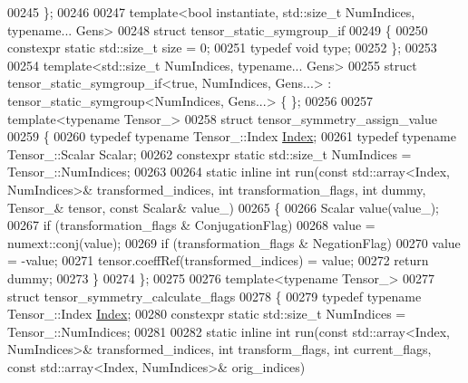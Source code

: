 \begin{DoxyCode}
00245 \};
00246 
00247 \textcolor{keyword}{template}<\textcolor{keywordtype}{bool} instantiate, std::size\_t NumIndices, \textcolor{keyword}{typename}... Gens>
00248 \textcolor{keyword}{struct }tensor\_static\_symgroup\_if
00249 \{
00250   constexpr \textcolor{keyword}{static} std::size\_t size = 0;
00251   \textcolor{keyword}{typedef} \textcolor{keywordtype}{void} type;
00252 \};
00253 
00254 \textcolor{keyword}{template}<std::size\_t NumIndices, \textcolor{keyword}{typename}... Gens>
00255 \textcolor{keyword}{struct }tensor\_static\_symgroup\_if<true, NumIndices, Gens...> : tensor\_static\_symgroup<NumIndices, Gens...> \{
      \};
00256 
00257 \textcolor{keyword}{template}<\textcolor{keyword}{typename} Tensor\_>
00258 \textcolor{keyword}{struct }tensor\_symmetry\_assign\_value
00259 \{
00260   \textcolor{keyword}{typedef} \textcolor{keyword}{typename} Tensor\_::Index \hyperlink{namespace_eigen_a62e77e0933482dafde8fe197d9a2cfde}{Index};
00261   \textcolor{keyword}{typedef} \textcolor{keyword}{typename} Tensor\_::Scalar Scalar;
00262   constexpr \textcolor{keyword}{static} std::size\_t NumIndices = Tensor\_::NumIndices;
00263 
00264   \textcolor{keyword}{static} \textcolor{keyword}{inline} \textcolor{keywordtype}{int} run(\textcolor{keyword}{const} std::array<Index, NumIndices>& transformed\_indices, \textcolor{keywordtype}{int} transformation\_flags,
       \textcolor{keywordtype}{int} dummy, Tensor\_& tensor, \textcolor{keyword}{const} Scalar& value\_)
00265   \{
00266     Scalar value(value\_);
00267     \textcolor{keywordflow}{if} (transformation\_flags & ConjugationFlag)
00268       value = numext::conj(value);
00269     \textcolor{keywordflow}{if} (transformation\_flags & NegationFlag)
00270       value = -value;
00271     tensor.coeffRef(transformed\_indices) = value;
00272     \textcolor{keywordflow}{return} dummy;
00273   \}
00274 \};
00275 
00276 \textcolor{keyword}{template}<\textcolor{keyword}{typename} Tensor\_>
00277 \textcolor{keyword}{struct }tensor\_symmetry\_calculate\_flags
00278 \{
00279   \textcolor{keyword}{typedef} \textcolor{keyword}{typename} Tensor\_::Index \hyperlink{namespace_eigen_a62e77e0933482dafde8fe197d9a2cfde}{Index};
00280   constexpr \textcolor{keyword}{static} std::size\_t NumIndices = Tensor\_::NumIndices;
00281 
00282   \textcolor{keyword}{static} \textcolor{keyword}{inline} \textcolor{keywordtype}{int} run(\textcolor{keyword}{const} std::array<Index, NumIndices>& transformed\_indices, \textcolor{keywordtype}{int} transform\_flags, \textcolor{keywordtype}{int} 
      current\_flags, \textcolor{keyword}{const} std::array<Index, NumIndices>& orig\_indices)

\end{DoxyCode}
